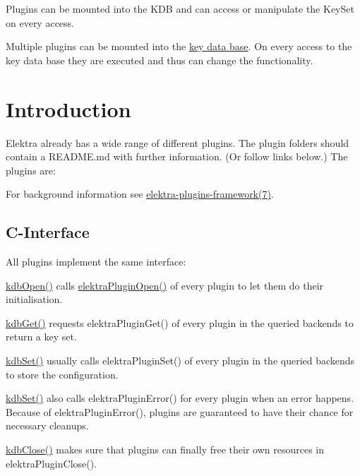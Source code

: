 Plugins can be mounted into the K\+D\+B and can access or manipulate the Key\+Set on every access.

Multiple plugins can be mounted into the \hyperlink{md_doc_help_elektra-glossary_doc_help_elektra-glossary_md}{key data base}. On every access to the key data base they are executed and thus can change the functionality.\hypertarget{md_src_plugins_README_src_plugins_README_md}{}\section{Introduction}\label{md_src_plugins_README_src_plugins_README_md}
Elektra already has a wide range of different plugins. The plugin folders should contain a R\+E\+A\+D\+M\+E.\+md with further information. (Or follow links below.) The plugins are\+:

 For background information see \hyperlink{md_doc_help_elektra-plugins-framework_doc_help_elektra-plugins-framework_md}{elektra-\/plugins-\/framework(7)}.

\subsection*{C-\/\+Interface}

All plugins implement the same interface\+:


\begin{DoxyItemize}
\item {\ttfamily \hyperlink{group__kdb_ga6808defe5870f328dd17910aacbdc6ca}{kdb\+Open()}} calls {\ttfamily \hyperlink{elektra_2plugin_8c_a32a70a7876542c51d153164ac5108a57}{elektra\+Plugin\+Open()}} of every plugin to let them do their initialisation.
\item {\ttfamily \hyperlink{group__kdb_ga28e385fd9cb7ccfe0b2f1ed2f62453a1}{kdb\+Get()}} requests {\ttfamily elektra\+Plugin\+Get()} of every plugin in the queried backends to return a key set.
\item {\ttfamily \hyperlink{group__kdb_ga11436b058408f83d303ca5e996832bcf}{kdb\+Set()}} usually calls {\ttfamily elektra\+Plugin\+Set()} of every plugin in the queried backends to store the configuration.
\item {\ttfamily \hyperlink{group__kdb_ga11436b058408f83d303ca5e996832bcf}{kdb\+Set()}} also calls {\ttfamily elektra\+Plugin\+Error()} for every plugin when an error happens. Because of {\ttfamily elektra\+Plugin\+Error()}, plugins are guaranteed to have their chance for necessary cleanups.
\item {\ttfamily \hyperlink{group__kdb_gadb54dc9fda17ee07deb9444df745c96f}{kdb\+Close()}} makes sure that plugins can finally free their own resources in {\ttfamily elektra\+Plugin\+Close()}.
\end{DoxyItemize}

